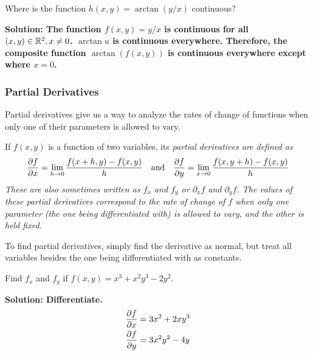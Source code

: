 \begin{example}
    Where is the function \(h(x,y)=\arctan(y/x)\) continuous?\par\bf{Solution: }The function \(f(x,y)=y/x\) is continuous for all \((x,y)\in\mathbb{R}^2, x\neq 0\). \(\arctan u\) is continuous everywhere. Therefore, the composite function \(\arctan(f(x, y))\) is continuous everywhere except where \(x=0\).
\end{example}
\subsubsection{Partial Derivatives}
Partial derivatives give us a way to analyze the rates of change of functions when only one of their parameters is allowed to vary. \par
If \(f(x,y)\) is a function of two variables, its \it{partial derivatives} are defined as
\[ \pdv{f}{x} = \lim_{h\to 0}\frac{f(x+h, y)-f(x,y)}{h}\quad\text{and}\quad\pdv{f}{y}=\lim_{x\to 0}\frac{f(x, y+h)-f(x,y)}{h}\]
These are also sometimes written as \(f_x\) and \(f_y\) or \(\partial_xf\) and \(\partial_yf\). The values of these partial derivatives correspond to the rate of change of \(f\) when only one parameter (the one being differentiated with) is allowed to vary, and the other is held fixed.\par
To find partial derivatives, simply find the derivative as normal, but treat all variables besides the one being differentiated with as constants.
\begin{example}
    Find \(f_x\) and \(f_y\) if \(f(x,y)=x^3+x^2y^3-2y^2\).\par\bf{Solution: }Differentiate.
    \begin{align*}
        \pdv{f}{x} &= 3x^2+2xy^3 \\
        \pdv{f}{y} &= 3x^2y^2-4y
    \end{align*}
\end{example}
